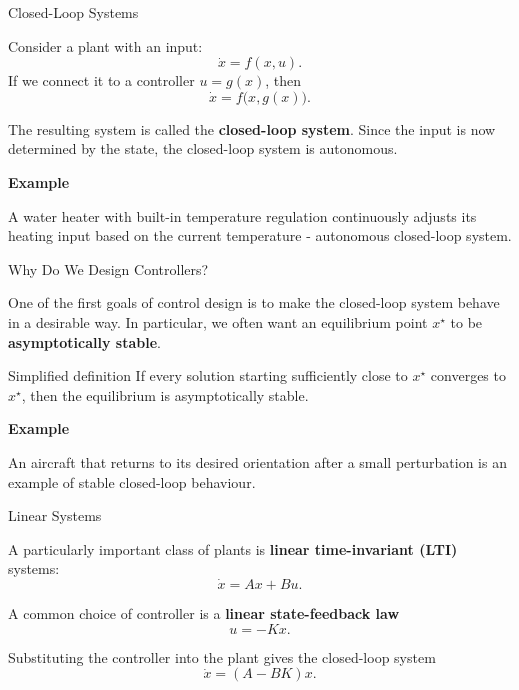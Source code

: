 \documentclass{beamer}
\begin{document}
\begin{frame}{Closed-Loop Systems}
	\begin{flushleft}
		
		Consider a plant with an input:
		\[
		\dot{x}=f(x,u).
		\]
		If we connect it to a controller \(u=g(x)\), then
		\[
		\dot{x}=f\bigl(x,g(x)\bigr).
		\]
		
		The resulting system is called the \textbf{closed-loop system}. Since the
		input is now determined by the state, the closed-loop system is autonomous.
		
		\bigskip
		
		{
		\textbf{Example}
		
		A water heater with built-in temperature regulation continuously adjusts its
		heating input based on the current temperature - autonomous closed-loop system.
	}
	
	\end{flushleft}
\end{frame}


\begin{frame}{Why Do We Design Controllers?}
	\begin{flushleft}
		
		One of the first goals of control design is to make the closed-loop system
		behave in a desirable way. In particular, we often want an equilibrium point \(x^\star\) to be
		\textbf{asymptotically stable}.
		
		\begin{block}{Simplified definition}
			If every solution starting sufficiently close to \(x^\star\) converges to
			\(x^\star\), then the equilibrium is asymptotically stable.
		\end{block}
		
		\bigskip
		
		{\mycolor{mydarkblue}
		\textbf{Example}
		
		An aircraft that returns to its desired orientation after a small perturbation
		is an example of stable closed-loop behaviour.
	}
		
	\end{flushleft}
\end{frame}


\begin{frame}{Linear Systems}
	\begin{flushleft}
		
		A particularly important class of plants is \textbf{linear time-invariant (LTI)}
		systems:
		\[
		\dot{x}=Ax+Bu.
		\]
		
		A common choice of controller is a \textbf{linear state-feedback law}
		\[
		u=-Kx.
		\]
		
		Substituting the controller into the plant gives the closed-loop system
		\[
		\dot{x}=(A-BK)x.
		\]
		
	\end{flushleft}
\end{frame}
\end{document}
